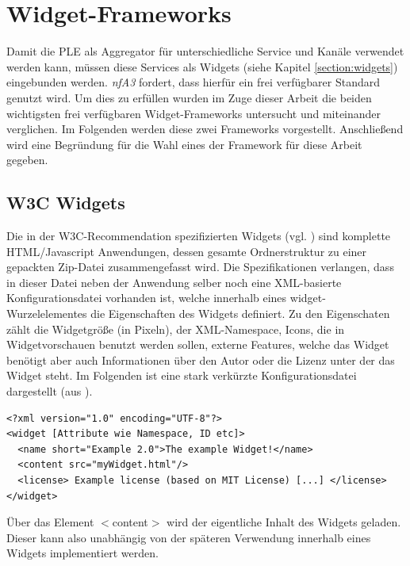 \section{Widget-Frameworks}\label{section:widget_frameworks}
Damit die PLE als Aggregator für unterschiedliche Service und Kanäle verwendet werden kann, müssen diese Services als Widgets (siehe Kapitel \ref{section:widgets}) eingebunden werden. \emph{nfA3} fordert, dass hierfür ein frei verfügbarer Standard genutzt wird. Um dies zu erfüllen wurden im Zuge dieser Arbeit die beiden wichtigsten frei verfügbaren Widget-Frameworks untersucht und miteinander verglichen. Im Folgenden werden diese zwei Frameworks vorgestellt. Anschließend wird eine Begründung für die Wahl eines der Framework für diese Arbeit gegeben.

\subsection{W3C Widgets}\label{section:w3c_widgets}
Die in der W3C-Recommendation spezifizierten Widgets (vgl. \cite{W3C-11-2012}) sind komplette HTML/Javascript Anwendungen, dessen gesamte Ordnerstruktur zu einer gepackten Zip-Datei zusammengefasst wird. Die Spezifikationen verlangen, dass in dieser Datei neben der Anwendung selber noch eine XML-basierte Konfigurationsdatei vorhanden ist, welche innerhalb eines widget-Wurzelelementes die Eigenschaften des Widgets definiert. Zu den Eigenschaten zählt die Widgetgröße (in Pixeln), der XML-Namespace, Icons, die in Widgetvorschauen benutzt werden sollen, externe Features, welche das Widget benötigt aber auch Informationen über den Autor oder die Lizenz unter der das Widget steht. Im Folgenden ist eine stark verkürzte Konfigurationsdatei dargestellt (aus \cite{W3C-11-2012}).
\begin{lstlisting}
<?xml version="1.0" encoding="UTF-8"?>
<widget [Attribute wie Namespace, ID etc]>
  <name short="Example 2.0">The example Widget!</name>
  <content src="myWidget.html"/>
  <license> Example license (based on MIT License) [...] </license>
</widget>
\end{lstlisting}
Über das Element $<$content$>$ wird der eigentliche Inhalt des Widgets geladen. Dieser kann also unabhängig von der späteren Verwendung innerhalb eines Widgets implementiert werden.

